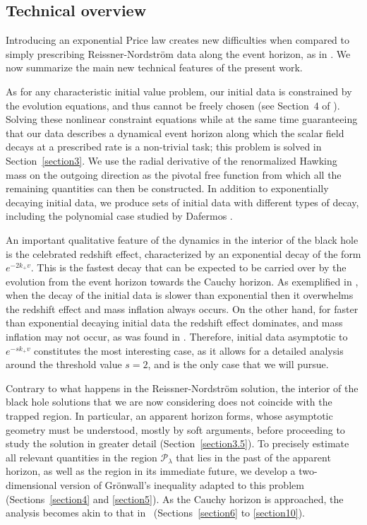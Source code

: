 \documentclass[a4paper,11pt,oneside,reqno]{amsart}
\newcommand{\cal}{\mathcal}
\begin{document}
\subsection{Technical overview}

Introducing an exponential Price law creates new difficulties when compared to simply prescribing Reissner-Nordstr\"{o}m data along the event horizon, as in \cite{relIst2, relIst3}. We now summarize the main new technical features of the present work.

As for any characteristic initial value problem, our initial data is constrained by the evolution equations, and thus cannot be freely chosen (see Section~4 of \cite{relIst1}). Solving these nonlinear constraint equations while at the same time guaranteeing that our data describes a dynamical event horizon along which the scalar field decays at a prescribed rate is a non-trivial task; this problem is solved in Section~\ref{section3}. We use the radial derivative of the renormalized Hawking mass on the outgoing direction as the pivotal free function from which all the remaining quantities can then be constructed. In addition to exponentially decaying initial data, we produce sets of initial data with different types of decay, including the polynomial case studied by Dafermos \cite{Dafermos2}.

An important qualitative feature of the dynamics in the interior of the black hole is the celebrated redshift effect, characterized by an exponential decay of the form $e^{-2k_+v}$. This is the fastest decay that can be expected to be carried over by the evolution from the event horizon towards the Cauchy horizon. As exemplified in \cite{Dafermos2}, when the decay of the initial data is slower than exponential then it overwhelms the redshift effect and mass inflation always occurs. On the other hand, for faster than exponential decaying initial data the redshift effect dominates, and mass inflation may not occur, as was found in \cite{relIst3}. Therefore, initial data asymptotic to $e^{-sk_+v}$ constitutes the most interesting case, as it allows for a detailed analysis around the threshold value $s=2$, and is the only case that we will pursue.

Contrary to what happens in the Reissner-Nordstr\"{o}m solution, the interior of the black hole solutions that we are now considering does not coincide with the trapped region. In particular, an apparent horizon forms, whose asymptotic geometry must be understood, mostly by soft arguments, before proceeding to study the solution in greater detail (Section~\ref{section3.5}). To precisely estimate all relevant quantities in the region ${\cal P}_{\lambda}$ that lies in the past of the apparent horizon, as well as the region in its immediate future, we develop a two-dimensional version of Gr\"onwall's inequality adapted to this problem (Sections~\ref{section4} and \ref{section5}). As the Cauchy horizon is approached, the analysis becomes akin to that in~\cite{relIst2, relIst3} (Sections~\ref{section6} to \ref{section10}).
\end{document}
